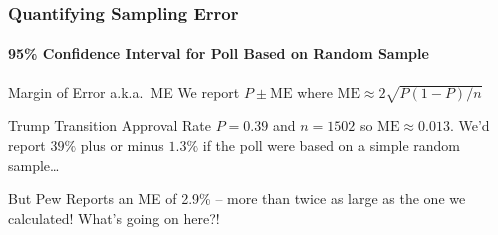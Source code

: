 %
%
%
\begin{frame}
\frametitle{Quantifying Sampling Error}
\framesubtitle{95\% Confidence Interval for Poll Based on Random Sample}

\begin{block}{Margin of Error a.k.a.\ ME}
  We report $P \pm \mbox{ME}$ where $\mbox{ME} \approx 2 \sqrt{P(1-P)/n}$
\end{block}

\pause

\begin{block}{Trump Transition Approval Rate}
$P = 0.39$ and $n = 1502$ so $\mbox{ME} \approx 0.013$.  We'd report $39\%$ plus or minus $1.3\%$ if the poll were based on a simple random sample\dots
\end{block}

\vspace{1em}

\pause

\alert{But Pew Reports an ME of 2.9\% -- more than twice as large as the one we calculated! What's going on here?!}

\end{frame}

